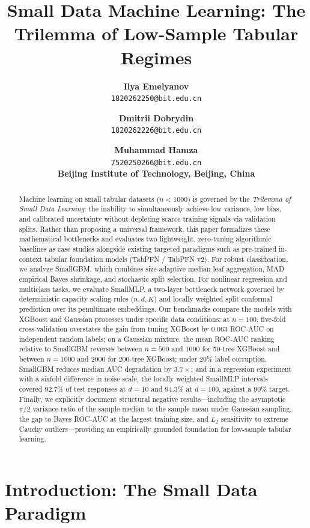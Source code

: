 \documentclass{article}
\title{Small Data Machine Learning: The Trilemma of Low-Sample Tabular Regimes}
\author{
  \textbf{Ilya Emelyanov}\footnotemark[1] \\
  \texttt{1820262250@bit.edu.cn}
  \and
  \textbf{Dmitrii Dobrydin} \\
  \texttt{1820262226@bit.edu.cn}
  \and
  \textbf{Muhammad Hamza} \\
  \texttt{7520250266@bit.edu.cn} \\[2ex]
  \textbf{Beijing Institute of Technology, Beijing, China}
}
\begin{document}
\maketitle
{}

\begin{abstract}
Machine learning on small tabular datasets ($n < 1000$) is governed by the \textit{Trilemma of Small Data Learning}: the inability to simultaneously achieve low variance, low bias, and calibrated uncertainty without depleting scarce training signals via validation splits. Rather than proposing a universal framework, this paper formalizes these mathematical bottlenecks and evaluates two lightweight, zero-tuning algorithmic baselines as case studies alongside existing targeted paradigms such as pre-trained in-context tabular foundation models (TabPFN / TabPFN v2). For robust classification, we analyze SmallGBM, which combines size-adaptive median leaf aggregation, MAD empirical Bayes shrinkage, and stochastic split selection. For nonlinear regression and multiclass tasks, we evaluate SmallMLP, a two-layer bottleneck network governed by deterministic capacity scaling rules ($n, d, K$) and locally weighted split conformal prediction over its penultimate embeddings. Our benchmarks compare the models with XGBoost and Gaussian processes under specific data conditions: at $n = 100$, five-fold cross-validation overstates the gain from tuning XGBoost by 0.063 ROC-AUC on independent random labels; on a Gaussian mixture, the mean ROC-AUC ranking relative to SmallGBM reverses between $n=500$ and $1000$ for 50-tree XGBoost and between $n=1000$ and $2000$ for 200-tree XGBoost; under $20\%$ label corruption, SmallGBM reduces median AUC degradation by $3.7\times$; and in a regression experiment with a sixfold difference in noise scale, the locally weighted SmallMLP intervals covered $92.7\%$ of test responses at $d=10$ and $94.3\%$ at $d=100$, against a $90\%$ target. Finally, we explicitly document structural negative results—including the asymptotic $\pi/2$ variance ratio of the sample median to the sample mean under Gaussian sampling, the gap to Bayes ROC-AUC at the largest training size, and $L_2$ sensitivity to extreme Cauchy outliers—providing an empirically grounded foundation for low-sample tabular learning.
\end{abstract}

\section{Introduction: The Small Data Paradigm}
\end{document}
